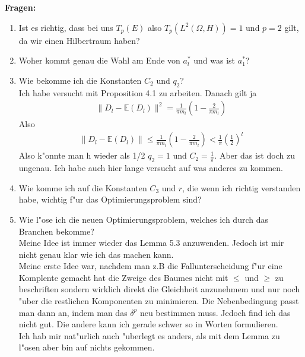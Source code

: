 \documentclass[12pt,twoside]{article}
\begin{document}
\textbf{Fragen:}
\begin{enumerate}
\item Ist es richtig, dass bei uns $T_p(E)$ also $T_p(L^2(\Omega,H))=1$ und $p=2$ gilt, da wir einen Hilbertraum haben?
\item Woher kommt genau die Wahl am Ende von $a_l^*$ und was ist $a_1^*$?
\item Wie bekomme ich die Konstanten $C_2$ und $q_2$?\\
Ich habe versucht mit Proposition 4.1 zu arbeiten. Danach gilt ja
\begin{align*}
\|D_l-\mathbb{E}(D_l)\|^2=\frac{1}{\pi m_l}(1-\frac{2}{\pi m_l})
\end{align*}
Also
\begin{align*}
\|D_l-\mathbb{E}(D_l)\|\leq\frac{1}{\pi m_l}(1-\frac{2}{\pi m_l})< \frac{1}{\pi}(\frac{1}{2})^l
\end{align*}
Also k"onnte man h wieder als 1/2 $q_2=1$ und $C_2=\frac{1}{\pi}$. Aber das ist doch zu ungenau. Ich habe auch hier lange versucht auf was anderes zu kommen.
\item Wie komme ich auf die Konstanten $C_3$ und $r$, die wenn ich richtig verstanden habe, wichtig f"ur das Optimierungsproblem sind?
\item Wie l"ose ich die neuen Optimierungsproblem, welches ich durch das Branchen bekomme?\\
Meine Idee ist immer wieder das Lemma 5.3 anzuwenden. Jedoch ist mir nicht genau klar wie ich das machen kann.\\
Meine erste Idee war, nachdem man z.B die Fallunterscheidung f"ur eine Komplente gemacht hat die Zweige des Baumes nicht mit $\leq$ und $\geq$ zu beschriften sondern wirklich direkt die Gleichheit anzunehmem und nur noch "uber die restlichen Komponenten zu minimieren. Die Nebenbedingung passt man dann an, indem man das $\delta^p$ neu bestimmen muss. Jedoch find ich das nicht gut.
Die andere kann ich gerade schwer so in Worten formulieren. \\
Ich hab mir nat"urlich auch "uberlegt es anders, als mit dem Lemma zu l"osen aber bin auf nichts gekommen.
\end{enumerate}
\end{document}
